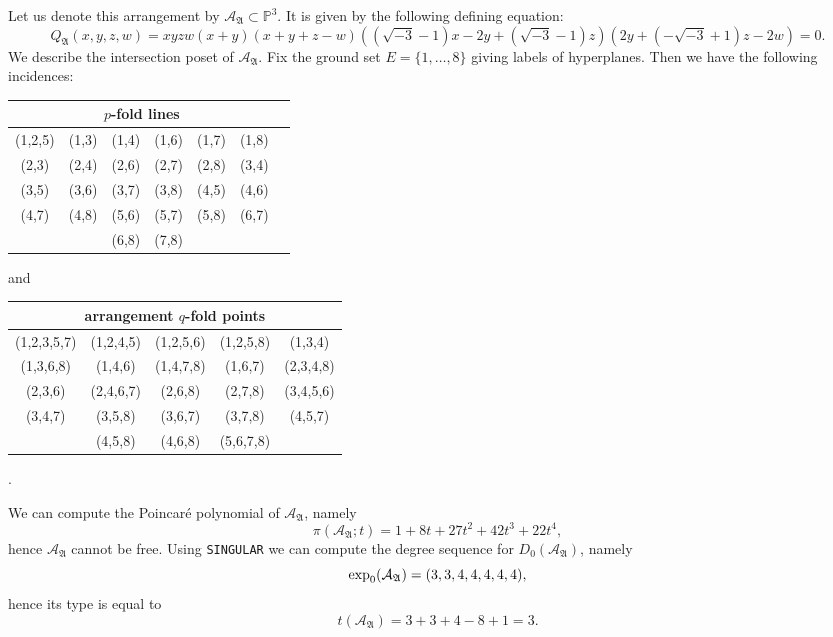 \documentclass[11pt]{article}
\theoremstyle{plain}
\theoremstyle{definition}
\begin{document}
\noindent
{}
\vskip 5pt
\noindent
Let us denote this arrangement by $\mathcal{A}_{\mathfrak{A}} \subset \mathbb{P}^{3}$. It is given by the following defining equation:
$$Q_{\mathfrak{A}}(x,y,z,w) =xyzw(x+y)(x+y+z-w)((\sqrt{-3}-1)x-2y+(\sqrt{-3}-1)z)(2y+(-\sqrt{-3}+1)z-2w) = 0.$$
We describe the intersection poset of $\mathcal{A}_{\mathfrak{A}}$. Fix the ground set $E= \{1, \ldots , 8\}$ giving labels of hyperplanes. Then we have the following incidences:
\begin{center}
\begin{tabular}{ c c c c c c c }
\multicolumn{6}{c}{$p$-fold lines} \\\hline \hline
 (1,2,5) &  (1,3) & (1,4) & (1,6) & (1,7) & (1,8) \\
 (2,3) & (2,4) & (2,6) & (2,7) & (2,8) & (3,4) \\
 (3,5) & (3,6) & (3,7) & (3,8) & (4,5) & (4,6) \\
 (4,7) & (4,8) & (5,6) & (5,7) & (5,8) & (6,7) \\
       &       & (6,8) & (7,8) &       &
 
\end{tabular}
\end{center}
and 
\begin{center}
\begin{tabular}{ c c c c c }
\multicolumn{5}{c}{arrangement $q$-fold points} \\ \hline \hline 
(1,2,3,5,7) & (1,2,4,5) & (1,2,5,6) & (1,2,5,8) & (1,3,4) \\
(1,3,6,8) & (1,4,6) & (1,4,7,8) & (1,6,7) & (2,3,4,8) \\
(2,3,6) & (2,4,6,7) & (2,6,8) & (2,7,8) & (3,4,5,6) \\
(3,4,7) & (3,5,8) & (3,6,7) & (3,7,8) & (4,5,7) \\
& (4,5,8) & (4,6,8) & (5,6,7,8) &
\end{tabular}.
\end{center}
We can compute the Poincar\'e polynomial of $\mathcal{A}_{\mathfrak{A}}$, namely
$$\pi(\mathcal{A}_{\mathfrak{A}};t) = 1 + 8t + 27t^{2} + 42t^{3} + 22t^{4},$$ 
hence $\mathcal{A}_{\mathfrak{A}}$ cannot be free. Using \texttt{SINGULAR} we can compute the degree sequence for $D_{0}(\mathcal{A}_{\mathfrak{A}})$, namely
$${\rm exp}_{0}(\mathcal{A}_{\mathfrak{A}}) = (3,3,4,4,4,4,4),$$
hence its type is equal to
$$t(\mathcal{A}_{\mathfrak{A}})= 3+3+4-8+1=3.$$
\end{document}
